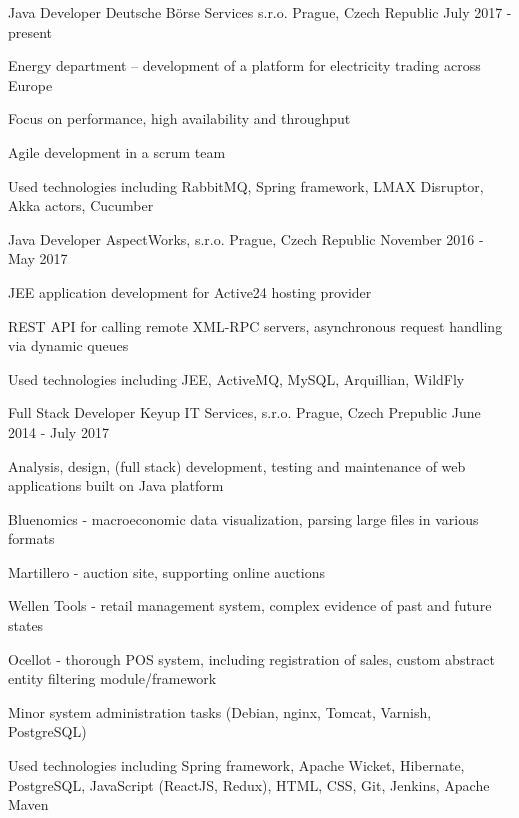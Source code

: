 \begin{cventries}
  \cventry
	{Java Developer}
	{Deutsche Börse Services s.r.o.}
	{Prague, Czech Republic}
	{July 2017 - present}
	{
	  \begin{cvitems}
	    \item {Energy department -- development of a platform for electricity trading across Europe}
	    \item {Focus on performance, high availability and throughput}
	    \item {Agile development in a scrum team}
	    \item {Used technologies including RabbitMQ, Spring framework, LMAX Disruptor, Akka actors, Cucumber}
	  \end{cvitems}
	}
  \cventry
    {Java Developer}
    {AspectWorks, s.r.o.}
    {Prague, Czech Republic}
    {November 2016 - May 2017}
    {
      \begin{cvitems}
        \item {JEE application development for Active24 hosting provider}
        \item {REST API for calling remote XML-RPC servers, asynchronous request handling via dynamic queues}
        \item {Used technologies including JEE, ActiveMQ, MySQL, Arquillian, WildFly}
      \end{cvitems}
    }
  \cventry
    {Full Stack Developer}
    {Keyup IT Services, s.r.o.}
    {Prague, Czech Prepublic}
    {June 2014 - July 2017}
    {
      \begin{cvitems}
        \item {Analysis, design, (full stack) development, testing and maintenance of web applications built on Java platform}
        \item {Bluenomics - macroeconomic data visualization, parsing large files in various formats}
        \item {Martillero - auction site, supporting online auctions}
        \item {Wellen Tools - retail management system, complex evidence of past and future states}
        \item {Ocellot - thorough POS system, including registration of sales, custom abstract entity filtering module/framework}
        \item {Minor system administration tasks (Debian, nginx, Tomcat, Varnish, PostgreSQL)}
        \item {Used technologies including Spring framework, Apache Wicket, Hibernate, PostgreSQL, JavaScript (ReactJS, Redux), HTML, CSS, Git, Jenkins, Apache Maven}
      \end{cvitems}
    }
\end{cventries}
